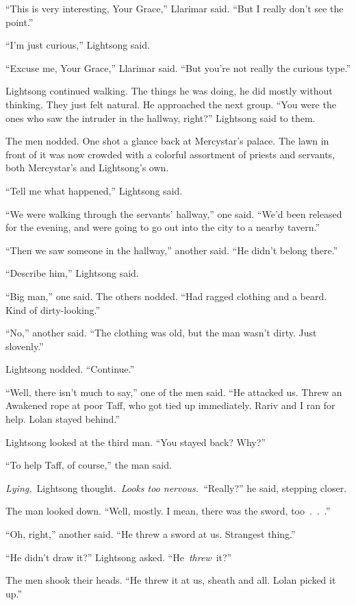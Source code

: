 “This is very interesting, Your Grace,” Llarimar said. “But I really don’t see the point.”

“I’m just curious,” Lightsong said.

“Excuse me, Your Grace,” Llarimar said. “But you’re not really the curious type.”

Lightsong continued walking. The things he was doing, he did mostly without thinking. They just felt natural. He approached the next group. “You were the ones who saw the intruder in the hallway, right?” Lightsong said to them.

The men nodded. One shot a glance back at Mercystar’s palace. The lawn in front of it was now crowded with a colorful assortment of priests and servants, both Mercystar’s and Lightsong’s own.

“Tell me what happened,” Lightsong said.

“We were walking through the servants’ hallway,” one said. “We’d been released for the evening, and were going to go out into the city to a nearby tavern.”

“Then we saw someone in the hallway,” another said. “He didn’t belong there.”

“Describe him,” Lightsong said.

“Big man,” one said. The others nodded. “Had ragged clothing and a beard. Kind of dirty-looking.”

“No,” another said. “The clothing was old, but the man wasn’t dirty. Just slovenly.”

Lightsong nodded. “Continue.”

“Well, there isn’t much to say,” one of the men said. “He attacked us. Threw an Awakened rope at poor Taff, who got tied up immediately. Rariv and I ran for help. Lolan stayed behind.”

Lightsong looked at the third man. “You stayed back? Why?”

“To help Taff, of course,” the man said.

\textit{Lying,}~Lightsong thought.~\textit{Looks too nervous.}~“Really?” he said, stepping closer.

The man looked down. “Well, mostly. I mean, there was the sword, too~.~.~.”

“Oh, right,” another said. “He threw a sword at us. Strangest thing.”

“He didn’t draw it?” Lightsong asked. “He~\textit{threw}~it?”

The men shook their heads. “He threw it at us, sheath and all. Lolan picked it up.”

